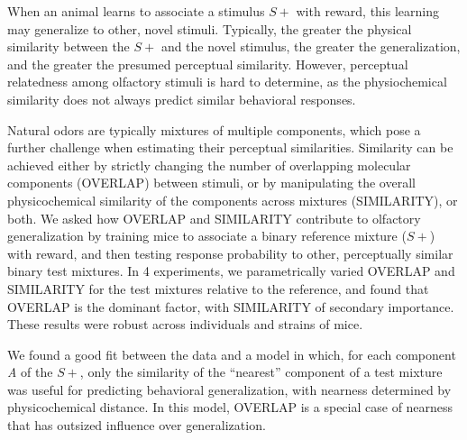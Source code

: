  When an animal learns to associate a stimulus $S+$ with reward, this learning may generalize to other, novel stimuli. Typically, the greater the physical similarity between the $S+$ and the novel stimulus, the greater the generalization, and the greater the presumed perceptual similarity. However, perceptual relatedness among olfactory stimuli is hard to determine, as the physiochemical similarity does not always predict similar behavioral responses.

Natural odors are typically mixtures of multiple components, which pose a further challenge when estimating their perceptual similarities.  Similarity can be achieved either by strictly changing the number of overlapping molecular components (OVERLAP) between stimuli, or by manipulating the overall physicochemical similarity of the components across mixtures (SIMILARITY), or both.  We asked how OVERLAP and SIMILARITY contribute to olfactory generalization by training mice to associate a binary reference mixture ($S+$) with reward, and then testing response probability to other, perceptually similar binary test mixtures.  In 4 experiments, we parametrically varied OVERLAP and SIMILARITY for the test mixtures relative to the reference, and found that OVERLAP is the dominant factor, with SIMILARITY of secondary importance.  These results were robust across individuals and strains of mice.

We found a good fit between the data and a model in which, for each component \textit{A} of the $S+$, only the similarity of the ``nearest'' component  of a test mixture was useful for predicting behavioral generalization, with nearness determined by physicochemical distance.  In this model, OVERLAP is a special case of nearness that has outsized influence over generalization.  